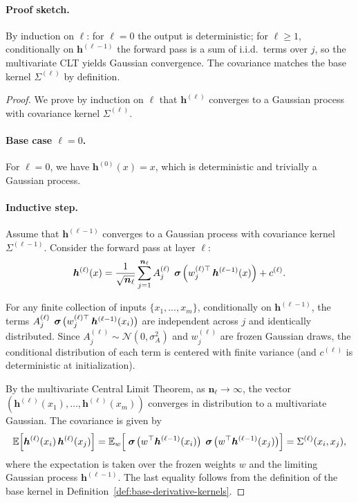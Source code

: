 \paragraph{Proof sketch.} By induction on \(\ell\): for \(\ell=0\) the output is deterministic; for \(\ell\ge 1\), conditionally on \(\bm{h}^{(\ell-1)}\) the forward pass is a sum of i.i.d.\ terms over \(j\), so the multivariate CLT yields Gaussian convergence. The covariance matches the base kernel \(\Sigma^{(\ell)}\) by definition.
\begin{proof}
We prove by induction on \( \ell \) that \( \bm{h}^{(\ell)} \) converges to a Gaussian process with covariance kernel \( \Sigma^{(\ell)} \).

\paragraph{Base case \( \ell=0 \).}
For \( \ell=0 \), we have \( \bm{h}^{(0)}(x) = x \), which is deterministic and trivially a Gaussian process.

\paragraph{Inductive step.}
Assume that \( \bm{h}^{(\ell-1)} \) converges to a Gaussian process with covariance kernel \( \Sigma^{(\ell-1)} \). Consider the forward pass at layer \( \ell \):
\begin{align}
\bm{h}^{(\ell)}(x) = \frac{1}{\sqrt{\bm{n}_\ell}} \sum_{j=1}^{\bm{n}_\ell} A^{(\ell)}_j\,\bm{\mathrel{\boldsymbol{\sigma}}}\!\Big(w^{(\ell)\top}_j\,\bm{h}^{(\ell-1)}(x)\Big) + c^{(\ell)}.
\end{align}

For any finite collection of inputs \( \{x_1, \dots, x_m\} \), conditionally on \( \bm{h}^{(\ell-1)} \), the terms \( A^{(\ell)}_j\,\bm{\mathrel{\boldsymbol{\sigma}}}\!\big(w^{(\ell)\top}_j\,\bm{h}^{(\ell-1)}(x_i)\big) \) are independent across \( j \) and identically distributed. Since \( A^{(\ell)}_j \sim \mathcal{N}(0, \sigma_A^2) \) and \( w^{(\ell)}_j \) are frozen Gaussian draws, the conditional distribution of each term is centered with finite variance (and \(c^{(\ell)}\) is deterministic at initialization).

By the multivariate Central Limit Theorem, as \( \bm{n}_\ell \to \infty \), the vector \( (\bm{h}^{(\ell)}(x_1), \dots, \bm{h}^{(\ell)}(x_m)) \) converges in distribution to a multivariate Gaussian. The covariance is given by
\begin{align}
\mathbb{E}\Big[\bm{h}^{(\ell)}(x_i)\,\bm{h}^{(\ell)}(x_j)\Big] = \mathbb{E}_{w}\Big[\bm{\mathrel{\boldsymbol{\sigma}}}\!\big(w^\top \bm{h}^{(\ell-1)}(x_i)\big)\,\bm{\mathrel{\boldsymbol{\sigma}}}\!\big(w^\top \bm{h}^{(\ell-1)}(x_j)\big)\Big] = \Sigma^{(\ell)}(x_i, x_j),
\end{align}
where the expectation is taken over the frozen weights \( w \) and the limiting Gaussian process \( \bm{h}^{(\ell-1)} \). The last equality follows from the definition of the base kernel in Definition~\ref{def:base-derivative-kernels}.


\end{proof}
